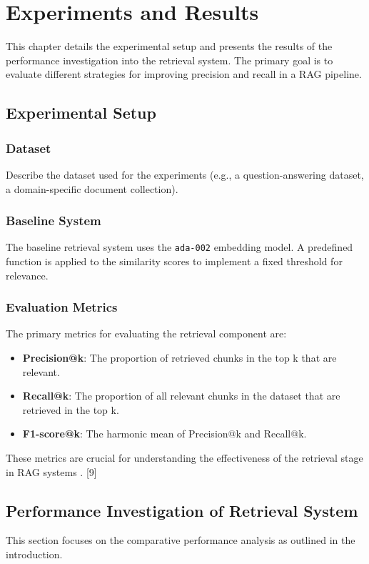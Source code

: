 \chapter{Experiments and Results}
\label{chap:experiments_results}

This chapter details the experimental setup and presents the results of the performance investigation into the retrieval system. The primary goal is to evaluate different strategies for improving precision and recall in a RAG pipeline.

\section{Experimental Setup}
\subsection{Dataset}
Describe the dataset used for the experiments (e.g., a question-answering dataset, a domain-specific document collection).
\subsection{Baseline System}
The baseline retrieval system uses the \texttt{ada-002} embedding model. A predefined function is applied to the similarity scores to implement a fixed threshold for relevance.
\subsection{Evaluation Metrics}
The primary metrics for evaluating the retrieval component are:
\begin{itemize}
    \item \textbf{Precision@k}: The proportion of retrieved chunks in the top k that are relevant.
    \item \textbf{Recall@k}: The proportion of all relevant chunks in the dataset that are retrieved in the top k.
    \item \textbf{F1-score@k}: The harmonic mean of Precision@k and Recall@k.
\end{itemize}
These metrics are crucial for understanding the effectiveness of the retrieval stage in RAG systems \autocite{rag_eval_ridgerun_2024}. [9]

\section{Performance Investigation of Retrieval System}
\label{sec:performance_investigation}
This section focuses on the comparative performance analysis as outlined in the introduction.

